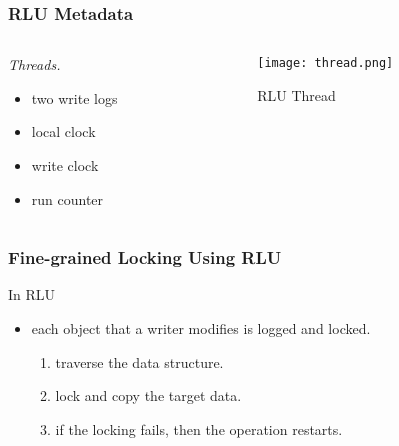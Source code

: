 \documentclass{beamer}
\begin{document}
\begin{frame}[t]
  \frametitle{RLU Metadata}

  \begin{columns}
    \begin{column}{.3\textwidth}
      \emph{Threads.}
      \begin{itemize}
      \item two write logs
      \item local clock
      \item write clock
      \item run counter
      \end{itemize}
    \end{column}

    \begin{column}{.7\textwidth}
      \begin{figure}[ht]
        \centering
        \texttt{[image: thread.png]}
        \caption{RLU Thread}
      \end{figure}
    \end{column}
  \end{columns}
  
\end{frame}


\begin{frame}[t]
  \frametitle{Fine-grained Locking Using RLU}
  In RLU
  \begin{itemize}
  \item each object that a writer modifies is logged and locked.
    \begin{enumerate}
    \item traverse the data structure.
    \item lock and copy the target data.
    \item if the locking fails, then the operation restarts.
    \end{enumerate}
  \end{itemize}
  
\end{frame}

\end{document}
